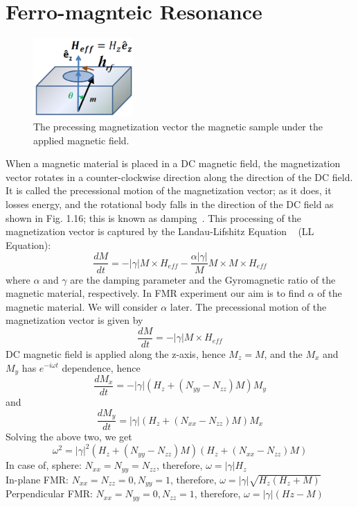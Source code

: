 \documentclass[12pt,a4paper,bold]{thesis}
\theoremstyle{thm}
\theoremstyle{definition}
\begin{document}
\section{Ferro-magnteic Resonance}
\begin{figure}[H]
	\centering
   \includegraphics[height=3cm]{Images/58.png} 
   \caption{The precessing magnetization vector the magnetic sample under the applied magnetic field.}
\end{figure}
\indent \indent\indent When a magnetic material is placed in a DC magnetic field, the magnetization vector rotates in a counter-clockwise direction along the direction of the DC field. It is called the precessional motion of the magnetization vector; as it does, it losses energy, and the rotational body falls in the direction of the DC field as shown in Fig. 1.16; this is known as damping~\cite{RefWorks:161, RefWorks:813}. This processing of the magnetization vector is captured by the Landau-Lifshitz Equation ~\cite{RefWorks:162, roy14_4} (LL Equation):
\[\frac{dM}{dt}=-|\gamma|M\times H_{eff} - \frac{\alpha |\gamma|}{M}M\times M\times H_{eff}\]
where $\alpha$ and $\gamma$ are the damping parameter and the Gyromagnetic ratio of the magnetic material, respectively. In FMR experiment our aim is to find $\alpha$ of the magnetic material.
We will consider $\alpha$ later. The precessional motion of the magnetization vector is given by 
\[\frac{dM}{dt}=-|\gamma|M\times H_{eff}\]
DC magnetic field is applied along the z-axis, hence $M_z=M$, and the $M_x$ and $M_y$ has $e^{-i\omega t}$ dependence, hence
\[\frac{dM_x}{dt}=-|\gamma|(H_z + (N_{yy}-N_{zz})M)M_y\]
and
\[\frac{dM_y}{dt}=|\gamma|(H_z + (N_{xx}-N_{zz})M)M_x\]
Solving the above two, we get
\[\omega^2=|\gamma|^2(H_z + (N_{yy}-N_{zz})M)(H_z+(N_{xx}-N_{zz})M)\]
In case of, sphere: $N_{xx}=N_{yy}=N_{zz}$, therefore, $\omega =|\gamma|H_z$\\
In-plane FMR: $N_{xx}=N_{zz}=0, N_{yy}=1$, therefore, $\omega =|\gamma|\sqrt{H_z(H_z+M)}$\\
Perpendicular FMR:  $N_{xx}=N_{yy}=0, N_{zz}=1$, therefore, $\omega =|\gamma|(Hz-M)$\\
\end{document}
